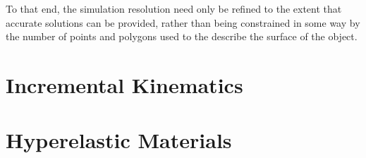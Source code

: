To that end, the simulation resolution need only be refined to the extent that accurate solutions can be provided, rather than being constrained in some way by the number of points and polygons used to the describe the surface of the object.

\section{Incremental Kinematics}
\label{Incremental Kinematics}

\section{Hyperelastic Materials}
\label{Hyperelastic Materials}

